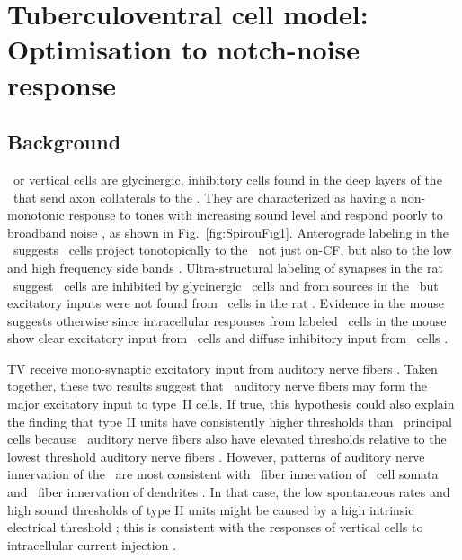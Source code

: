 
\section[TV Cell Model]{Tuberculoventral cell model: Optimisation to notch-noise response \label{sec:TV-cell-model}}

\subsection{Background}

\TV~or vertical cells are glycinergic, inhibitory cells found in the deep layers of the
\DCN~that send axon collaterals to the \VCN\@. They are characterized as having
a non-monotonic response to tones with increasing sound level and respond poorly
to broadband noise
\citep{SpirouDavisEtAl:1999,NelkenYoung:1997,ReissYoung:2005}, as shown in
Fig.~\ref{fig:SpirouFig1}.  Anterograde labeling in the \DCN~suggests \TV~cells
project tonotopically to the \VCN~not just on-CF, but also to the low and high
frequency side bands
\citep{MunirathinamOstapoffEtAl:2004,OstapoffMorestEtAl:1999}.  Ultra-structural
labeling of synapses in the rat \DCN~suggest \TV~cells are inhibited by
glycinergic \DS~cells and from sources in the \DCN~but excitatory inputs were
not found from \TS~cells in the rat \citep{Rubio:2005}. Evidence in the mouse
suggests otherwise since intracellular responses from labeled \TV~cells in the
mouse show clear excitatory input from \TS~cells and diffuse inhibitory input
from \DS~cells \citep{ZhangOertel:1993b,WickesbergOertel:1993}.


TV  receive mono-synaptic excitatory input from auditory nerve
ﬁbers \citep{OertelWu:1989,ZhangOertel:1993b}. Taken together, these two results
suggest that \LSR~auditory nerve ﬁbers may form the major excitatory input to
type~II cells. If true, this hypothesis could also explain the ﬁnding that type
II units have consistently higher thresholds than \DCN~principal cells
\citep{YoungBrownell:1976} because \LSR~auditory nerve ﬁbers also have elevated
thresholds relative to the lowest threshold auditory nerve ﬁbers
\citep{Liberman:1978}. However, patterns of auditory nerve innervation of the
\DCN~are most consistent with \HSR~ﬁber innervation of \TV~cell somata and
\LSR~ﬁber innervation of dendrites \citep{Liberman:1993}. In that case, the low
spontaneous rates and high sound thresholds of type II units might be caused by
a high intrinsic electrical threshold \citep{HancockDavisEtAl:1997}; this is
consistent with the responses of vertical cells to intracellular current
injection \citep{DingVoigt:1997,ZhangOertel:1993b}.

